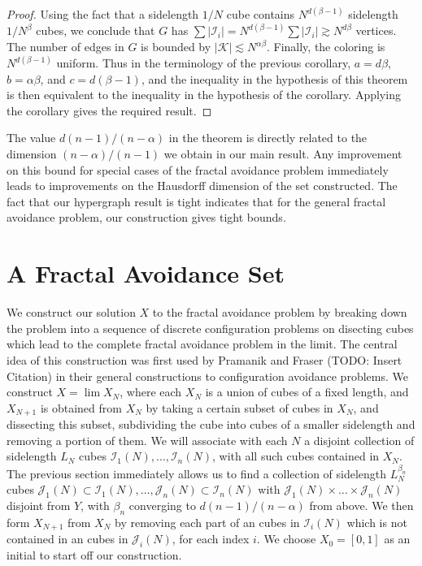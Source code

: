\documentclass{article}
\theoremstyle{plain}
\theoremstyle{plain}
\begin{document}
\begin{multicols}{2}
\begin{proof}
	Using the fact that a sidelength $1/N$ cube contains $N^{d(\beta - 1)}$ sidelength $1/N^\beta$ cubes, we conclude that $G$ has $\sum |\mathcal{I}_i| = N^{d(\beta - 1)} \sum |\mathcal{I}_i| \gtrsim N^{d \beta}$ vertices. The number of edges in $G$ is bounded by $|\mathcal{K}| \lesssim N^{\alpha \beta}$. Finally, the coloring is $N^{d(\beta - 1)}$ uniform. Thus in the terminology of the previous corollary, $a = d \beta$, $b = \alpha \beta$, and $c = d(\beta - 1)$, and the inequality in the hypothesis of this theorem is then equivalent to the inequality in the hypothesis of the corollary. Applying the corollary gives the required result.
\end{proof}

The value $d(n-1)/(n-\alpha)$ in the theorem is directly related to the dimension $(n-\alpha)/(n-1)$ we obtain in our main result. Any improvement on this bound for special cases of the fractal avoidance problem immediately leads to improvements on the Hausdorff dimension of the set constructed. The fact that our hypergraph result is tight indicates that for the general fractal avoidance problem, our construction gives tight bounds.


\section{A Fractal Avoidance Set}

We construct our solution $X$ to the fractal avoidance problem by breaking down the problem into a sequence of discrete configuration problems on disecting cubes which lead to the complete fractal avoidance problem in the limit. The central idea of this construction was first used by Pramanik and Fraser (TODO: Insert Citation) in their general constructions to configuration avoidance problems. We construct $X = \lim X_N$, where each $X_N$ is a union of cubes of a fixed length, and $X_{N+1}$ is obtained from $X_N$ by taking a certain subset of cubes in $X_N$, and dissecting this subset, subdividing the cube into cubes of a smaller sidelength and removing a portion of them. We will associate with each $N$ a disjoint collection of sidelength $L_N$ cubes $\mathcal{I}_1(N), \dots, \mathcal{I}_n(N)$, with all such cubes contained in $X_N$. The previous section immediately allows us to find a collection of sidelength $L_N^{\beta_n}$ cubes $\mathcal{J}_1(N) \subset \mathcal{I}_1(N), \dots, \mathcal{J}_n(N) \subset \mathcal{I}_n(N)$ with $\mathcal{J}_1(N) \times \dots \times \mathcal{J}_n(N)$ disjoint from $Y$, with $\beta_n$ converging to $d(n-1)/(n-\alpha)$ from above. We then form $X_{N+1}$ from $X_N$ by removing each part of an cubes in $\mathcal{I}_i(N)$ which is not contained in an cubes in $\mathcal{J}_i(N)$, for each index $i$. We choose $X_0 = [0,1]$ as an initial to start off our construction.


\end{multicols}
\end{document}
